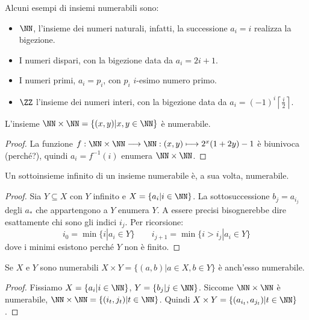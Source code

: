 \documentclass[11pt]{scrartcl}
\begin{document}
\begin{example}
	Alcuni esempi di insiemi numerabili sono:
	\begin{itemize}
		\item $\NN$, l'insieme dei numeri naturali, infatti, la successione $a_i = i$ realizza la bigezione.
		\item I numeri dispari, con la bigezione data da $a_i = 2i + 1$.
		\item I numeri primi, $a_i = p_i$, con $p_i$ $i$-esimo numero primo.
		\item $\ZZ$ l'insieme dei numeri interi, con la bigezione data da $a_i = \displaystyle (-1)^i \left\lceil\frac{i}{2}\right\rceil$.
	\end{itemize}
\end{example}

\begin{examplem}
L'insieme $\NN \times \NN = \{(x,y) | x,y \in \NN\}$ è numerabile.
\end{examplem}

\begin{proof}
La funzione $f : \NN \times \NN \longrightarrow \NN : (x,y) \longmapsto 2^x(1+2y) - 1$ è biunivoca (perché?), quindi $a_i = f^{-1}(i)$ enumera $\NN \times \NN$.
\end{proof}

\begin{proposition}
Un sottoinsieme infinito di un insieme numerabile è, a sua volta, numerabile.
\end{proposition}

\begin{proof}
Sia $Y \subseteq X$ con $Y$ infinito e $X = \{a_i | i \in \NN\}$. La sottosuccessione $b_j = a_{i_j}$ degli $a_*$ che appartengono a $Y$ enumera $Y$. A essere precisi 
bisognerebbe dire esattamente chi sono gli indici $i_j$. Per ricorsione:
\[ i_0 = \min\{i | a_i \in Y\} \qquad i_{j+1} = \min\{i > i_j | a_i \in Y\}
	\]
dove i minimi esistono perché $Y$ non è finito.
\end{proof}

\begin{proposition}
Se $X$ e $Y$ sono numerabili $X \times Y = \{(a,b) | a \in X, b \in Y\}$ è anch'esso numerabile.
\end{proposition}

\begin{proof}
Fissiamo $X = \{a_i | i \in \NN\}$, $Y = \{b_j | j \in \NN\}$. Siccome $\NN \times \NN$ è numerabile, $\NN \times \NN = \{(i_t,j_t)|t \in \NN\}$.
Quindi $X \times Y = \{(a_{i_t}, a_{j_t}) | t \in \NN\}$.
\end{proof}
\end{document}
